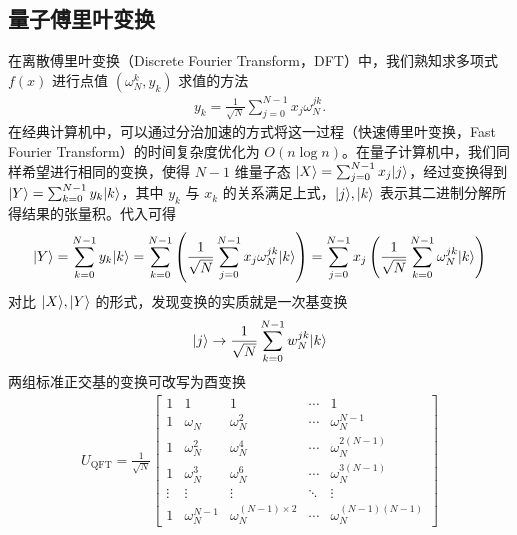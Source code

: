 \subsection{量子傅里叶变换}

在离散傅里叶变换（Discrete Fourier Transform，DFT）中，我们熟知求多项式 $f(x)$ 进行点值 $(\omega_N^k,y_k)$ 求值的方法 \begin{align*}
    y_k=\frac{1}{\sqrt{N}}\sum_{j=0}^{N-1}x_j\omega_N^{jk}.
\end{align*}
在经典计算机中，可以通过分治加速的方式将这一过程（快速傅里叶变换，Fast Fourier Transform）的时间复杂度优化为 $O(n\log n)$\cite{cooley1965algorithm}。在量子计算机中，我们同样希望进行相同的变换，使得 $N-1$ 维量子态 $|X\rangle=\sum_{j=0}^{N-1}x_j|j\rangle$，经过变换得到 $|Y\rangle=\sum_{k=0}^{N-1}y_k|k\rangle$，其中 $y_k$ 与 $x_k$ 的关系满足上式，$|j\rangle,|k\rangle$ 表示其二进制分解所得结果的张量积。代入可得 \begin{align*}
    |Y\rangle=\sum_{k=0}^{N-1}y_k|k\rangle=\sum_{k=0}^{N-1}\left(\frac{1}{\sqrt{N}}\sum_{j=0}^{N-1}x_j\omega_N^{jk}|k\rangle\right)=\sum_{j=0}^{N-1}x_j\left(\frac{1}{\sqrt{N}}\sum_{k=0}^{N-1}\omega_N^{jk}|k\rangle\right)
\end{align*}
对比 $|X\rangle,|Y\rangle$ 的形式，发现变换的实质就是一次基变换 \begin{align*}
    |j\rangle\to\frac{1}{\sqrt{N}}\sum_{k=0}^{N-1}w_N^{jk}|k\rangle
\end{align*}
两组标准正交基的变换可改写为酉变换 \begin{align*}
    U_{\text{QFT}} = \frac{1}{\sqrt{N}}
    \begin{bmatrix}
        1      & 1               & 1                         & \cdots & 1                      \\
        1      & \omega_N        & \omega_N ^{2}             & \cdots & \omega_N ^{N-1}        \\
        1      & \omega_N ^{2}   & \omega_N ^{4}             & \cdots & \omega_N ^{2(N-1)}     \\
        1      & \omega_N ^{3}   & \omega_N ^{6}             & \cdots & \omega_N ^{3(N-1)}     \\
        \vdots & \vdots          & \vdots                    & \ddots & \vdots                 \\
        1      & \omega_N ^{N-1} & \omega_N ^{(N-1)\times 2} & \cdots & \omega_N ^{(N-1)(N-1)}
    \end{bmatrix}
\end{align*}
